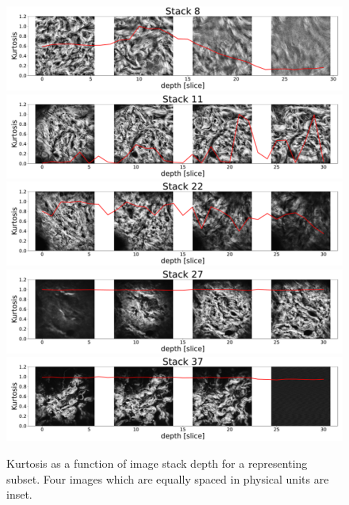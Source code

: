 \begin{figure}
    \centering
    \includegraphics[width=\linewidth]{skinstression/images/kurtosis/8.pdf} \\
    \includegraphics[width=\linewidth]{skinstression/images/kurtosis/11.pdf} \\
    \includegraphics[width=\linewidth]{skinstression/images/kurtosis/22.pdf} \\
    \includegraphics[width=\linewidth]{skinstression/images/kurtosis/27.pdf} \\
    \includegraphics[width=\linewidth]{skinstression/images/kurtosis/37.pdf}
    \caption[Kurtosis vs image stack depth]{
        Kurtosis as a function of image stack depth for a representing subset.
        Four images which are equally spaced in physical units are inset.
    }
    \label{fig:skin_kurtosis_depth}
\end{figure}

